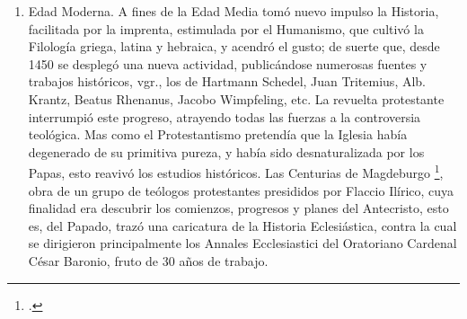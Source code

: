 \raggedbottom{} \documentclass[12pt, a4paper]{book}
\begin{document}
\begin{enumerate}
        Crónicas nos dejaron San Isidoro de Sevilla (PL.\@ 83), Beda el Venerable (PL.\@ 95), Regino de Prüm, m. 915 (PL.\@ 132, MG.\@ SS.\@ 1.\@ 537, ss.), Herman Contracto, m. 1054 (PL.\@ 143, MG.\@ SS.\@ 5.\@ 67 ss.), Lamberto de Hersfeld, m.\@ 1080 (PL.\@ 146, MG.\@ SS.\@ 1, 3 y 5), Sigeberto de Gemblours, m.\@ 1112 (PL.\@ 160, MG.\@ SS.\@ 6.\@ 260), Otón de Frisinga, m.\@ 1158 (PL.\@ 189, MG.\@ SS.\@ 20.\@ 83 ss.) y otros. Gregorio de Tours (m.\@ 594) escribió la Historia de los Francos (PL.\@ 71, MG.\@ SS.\@ rer.\@ Mer.\@ v.\@ 1.), continuada por Fredegario; Beda la Histor.\@ gentis Anglorum (PL.\@ 95); Isidoro de Sevilla la Histor.\@ gentis Visigothorum (PL.\@ 83), Pablo Warnefrido (m.\@ 799) la Histor.\@ gentis Langobardorum (PL.\@ 95), Flodoardo (m.\@ 966) la Histor.\@ Rhemensis (PL.\@ 135, MG.\@ SS.\@ 13), Adam de Brema la Gesta pontif.\@ Hammaburgens.\@ (PL.\@ 146). Para la Historia de los Papas es de grande importancia el Liber Pontificalis \footcite{Duchesne1884Liber}, colección de biografías de los Papas, cuya primera redacción se coloca a principios del siglo vi, la segunda termina el 687, la tercera el 715; todo él fué refundido y continuado hasta 882. Son generales la Historia Eclesiástica de Haimón de Halberstad (PL.\@ 116), la Historia tripartita de Anastasio bibliotecario (PL.\@ 108), la Historia Eclesiástica de Orderico Vital (m.\@ c.\@ 1142.\@ PL.\@ 188), la de Ptolomeo de Lucca\footnote{Bei Muratori, Rer.\ ital.\ script.\ 11.\ 751 ss.}, discípulo de Santo Tomás de Aquino, y la Summa historialis de San Antonino de Florencia (m. 1459)\footnote{Ed.\ Norimb.\ 1484, Lugd.\ 1512.},
  \item Edad Moderna. A fines de la Edad Media tomó nuevo impulso la Historia, facilitada por la imprenta, estimulada por el Humanismo, que cultivó la Filología griega, latina y hebraica, y acendró el gusto; de suerte que, desde 1450 se desplegó una nueva actividad, publicándose numerosas fuentes y trabajos históricos, vgr., los de Hartmann Schedel, Juan Tritemius, Alb. Krantz, Beatus Rhenanus, Jacobo Wimpfeling, etc. La revuelta protestante interrumpió este progreso, atrayendo todas las fuerzas a la controversia teológica. Mas como el Protestantismo pretendía que la Iglesia había degenerado de su primitiva pureza, y había sido desnaturalizada por los Papas, esto reavivó los estudios históricos. Las Centurias de Magdeburgo \footcite{Magdeb1559Eccles}, obra de un grupo de teólogos protestantes presididos por Flaccio Ilírico, cuya finalidad era descubrir los comienzos, progresos y planes del Antecristo, esto es, del Papado, trazó una caricatura de la Historia Eclesiástica, contra la cual se dirigieron principalmente los Annales Ecclesiastici del Oratoriano Cardenal César Baronio, fruto de 30 años de trabajo.\\

\end{enumerate}
\end{document}
